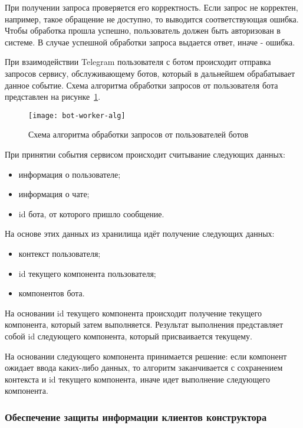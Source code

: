 При получении запроса проверяется его корректность.
Если запрос не корректен, например, такое обращение не доступно, то
выводится соответствующая ошибка. Чтобы обработка прошла успешно, пользователь
должен быть авторизован в системе. В случае успешной обработки запроса выдается
ответ, иначе - ошибка.


При взаимодействии Telegram пользователя с ботом происходит
отправка запросов сервису, обслуживающему ботов, который в дальнейшем
обрабатывает данное событие. Схема алгоритма обработки запросов от
пользователя бота представлен на рисунке~\ref{f:bot-worker-alg}.


\begin{figure}[hp]
	\centering
	\texttt{[image: bot-worker-alg]}
	\caption{Схема алгоритма обработки запросов от пользователей ботов}
	\label{f:bot-worker-alg}
\end{figure}

При принятии события сервисом происходит считывание следующих
данных:
\begin{itemize}
	\item информация о пользователе;
	\item информация о чате;
	\item id бота, от которого пришло сообщение.
\end{itemize}

На основе этих данных из хранилища идёт получение следующих
данных:
\begin{itemize}
	\item контекст пользователя;
	\item id текущего компонента пользователя;
	\item компонентов бота.
\end{itemize}

На основании id текущего компонента происходит получение текущего
компонента, который затем выполняется. Результат выполнения представляет
собой id следующего компонента, который присваивается текущему.

На основании следующего компонента принимается решение: если
компонент ожидает ввода каких-либо данных, то алгоритм заканчивается с
сохранением контекста и id текущего компонента, иначе идет выполнение
следующего компонента.

\newpage

\subsubsection{Обеспечение защиты информации клиентов конструктора}
